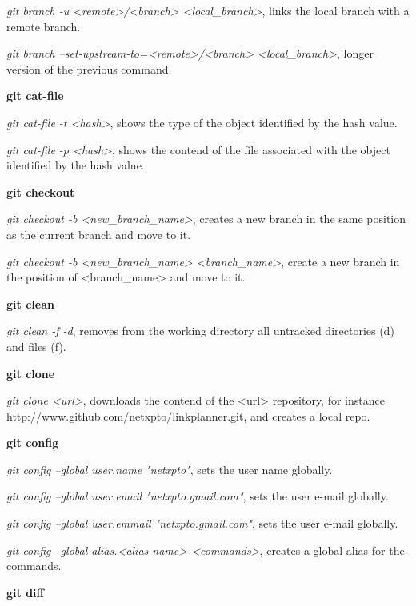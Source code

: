 \begin{refsection}
\noindent \emph{git branch -u <remote>/<branch> <local\_branch>}, links the local branch with a remote branch.

\noindent \emph{git branch --set-upstream-to=<remote>/<branch> <local\_branch>}, longer version of the previous command.

\vspace*{5mm} \noindent \textbf{git cat-file}

\noindent \emph{git cat-file -t <hash>}, shows the type of the object identified by the hash value.

\noindent \emph{git cat-file -p <hash>}, shows the contend of the file associated with the object identified by the hash value.


\vspace*{5mm} \noindent \textbf{git checkout}

\noindent \emph{git checkout -b <new\_branch\_name>}, creates a new branch in the same position as the current branch and move to it.

\noindent \emph{git checkout -b <new\_branch\_name> <branch\_name>}, create a new branch in the position of <branch\_name> and move to it.

\vspace*{5mm} \noindent \textbf{git clean}

\noindent \emph{git clean -f -d}, removes from the working directory all untracked directories (d) and files (f).

\vspace*{5mm} \noindent \textbf{git clone}

\noindent \emph{git clone <url>}, downloads the contend of the <url> repository, for instance http://www.github.com/netxpto/linkplanner.git, and creates a local repo.

\vspace*{5mm} \noindent \textbf{git config}

\noindent \emph{git config --global user.name "netxpto"}, sets the user name globally.

\noindent \emph{git config --global user.email "netxpto.gmail.com"}, sets the user e-mail globally.

\noindent \emph{git config --global user.emmail "netxpto.gmail.com"}, sets the user e-mail globally.

\noindent \emph{git config --global alias.<alias name> <commands>}, creates a global alias for the commands.

\vspace*{5mm} \noindent \textbf{git diff}


\end{refsection}
